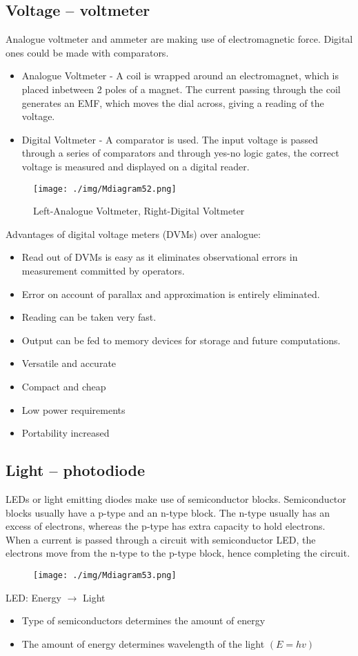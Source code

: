 \subsection{Voltage – voltmeter}
Analogue voltmeter and ammeter are making use of electromagnetic force. Digital ones could be made with comparators.
\begin{itemize}
  \item Analogue Voltmeter - A coil is wrapped around an electromagnet, which is placed inbetween 2 poles of a magnet. The current passing through the coil generates an EMF, which moves the dial across, giving a reading of the voltage.
  \item Digital Voltmeter - A comparator is used. The input voltage is passed through a series of comparators and through yes-no logic gates, the correct voltage is measured and displayed on a digital reader.
\end{itemize}
\begin{figure}[H]
  \centering
  \texttt{[image: ./img/Mdiagram52.png]}
  \caption{Left-Analogue Voltmeter, Right-Digital Voltmeter}
\end{figure}
Advantages of digital voltage meters (DVMs) over analogue:
\begin{itemize}
  \item Read out of DVMs is easy as it eliminates observational errors in measurement committed by operators.
  \item Error on account of parallax and approximation is entirely eliminated.
  \item Reading can be taken very fast.
  \item Output can be fed to memory devices for storage and future computations.
  \item Versatile and accurate
  \item Compact and cheap
  \item Low power requirements
  \item Portability increased
\end{itemize}
\subsection{Light – photodiode}
LEDs or light emitting diodes make use of semiconductor blocks. Semiconductor blocks usually have a p-type and an n-type block. The n-type usually has an excess of electrons, whereas the p-type has extra capacity to hold electrons. When a current is passed through a circuit with semiconductor LED, the electrons move from the n-type to the p-type block, hence completing the circuit.
\begin{figure}[H]
  \centering
  \texttt{[image: ./img/Mdiagram53.png]}
\end{figure}
LED: Energy $\rightarrow$ Light
\begin{itemize}
  \item Type of semiconductors determines the amount of energy
  \item The amount of energy determines wavelength of the light $(E = hv)$
\end{itemize}
